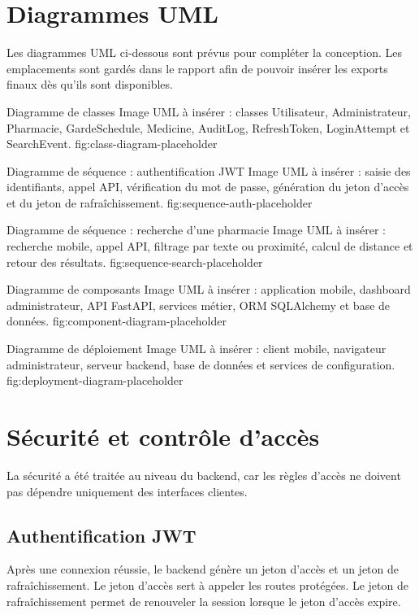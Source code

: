 \section{Diagrammes UML}

Les diagrammes UML ci-dessous sont prévus pour compléter la conception. Les emplacements sont gardés
dans le rapport afin de pouvoir insérer les exports finaux dès qu'ils sont disponibles.

\placeholderfigure
{Diagramme de classes}
{Image UML à insérer : classes Utilisateur, Administrateur, Pharmacie, GardeSchedule, Medicine, AuditLog, RefreshToken, LoginAttempt et SearchEvent.}
{fig:class-diagram-placeholder}

\placeholderfigure
{Diagramme de séquence : authentification JWT}
{Image UML à insérer : saisie des identifiants, appel API, vérification du mot de passe, génération du jeton d'accès et du jeton de rafraîchissement.}
{fig:sequence-auth-placeholder}

\placeholderfigure
{Diagramme de séquence : recherche d'une pharmacie}
{Image UML à insérer : recherche mobile, appel API, filtrage par texte ou proximité, calcul de distance et retour des résultats.}
{fig:sequence-search-placeholder}

\placeholderfigure
{Diagramme de composants}
{Image UML à insérer : application mobile, dashboard administrateur, API FastAPI, services métier, ORM SQLAlchemy et base de données.}
{fig:component-diagram-placeholder}

\placeholderfigure
{Diagramme de déploiement}
{Image UML à insérer : client mobile, navigateur administrateur, serveur backend, base de données et services de configuration.}
{fig:deployment-diagram-placeholder}

\section{Sécurité et contrôle d'accès}

La sécurité a été traitée au niveau du backend, car les règles d'accès ne doivent pas dépendre uniquement
des interfaces clientes.

\subsection{Authentification JWT}

Après une connexion réussie, le backend génère un jeton d'accès et un jeton de rafraîchissement. Le
jeton d'accès sert à appeler les routes protégées. Le jeton de rafraîchissement permet de renouveler la
session lorsque le jeton d'accès expire.


